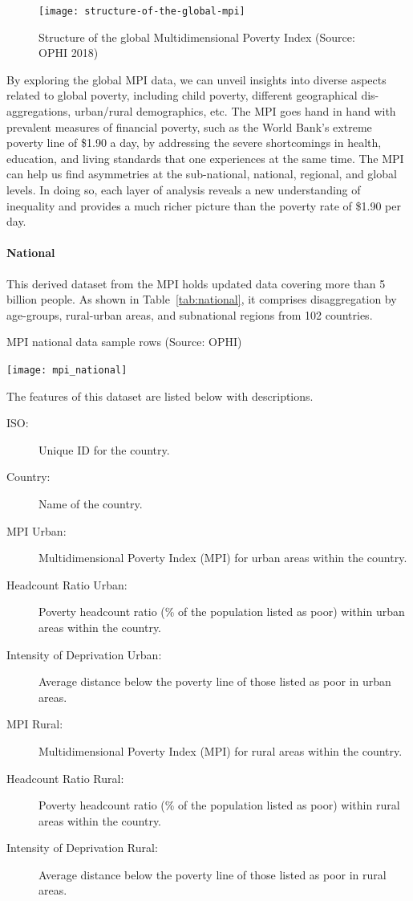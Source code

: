 \documentclass{swfuthesise}
\begin{document}
\begin{figure}[!htp]
    \centering
    \texttt{[image: structure-of-the-global-mpi]}
    \caption{Structure of the global Multidimensional Poverty Index (Source: OPHI 2018)}
    \label{fig:mpi}
\end{figure}

By exploring the global MPI data, we can unveil insights into diverse aspects related to global poverty, including child poverty, different geographical dis-aggregations, urban/rural demographics, etc. The MPI goes hand in hand with prevalent measures of financial poverty, such as the World Bank's extreme poverty line of \$1.90 a day\cite{world2020poverty}, by addressing the severe shortcomings in health, education, and living standards that one experiences at the same time. The MPI can help us find asymmetries at the sub-national, national, regional, and global levels. In doing so, each layer of analysis reveals a new understanding of inequality and provides a much richer picture than the poverty rate of \$1.90 per day.

\paragraph{National}

This derived dataset from the MPI holds updated data covering more than 5 billion
people. As shown in Table~\ref{tab:national}, it comprises disaggregation by age-groups, rural-urban areas, and subnational regions from 102 countries.

\begin{table}[ht]
  \centering
  \caption{MPI national data sample rows (Source: OPHI)\label{tab:national}}
  \texttt{[image: mpi\_national]}
\end{table}
  
The features of this dataset are listed below with descriptions.%
\begin{description}
\item[ISO:] Unique ID for the country.
\item[Country:] Name of the country.
\item[MPI Urban:] Multidimensional Poverty Index (MPI) for urban areas within the country.
\item[Headcount Ratio Urban:] Poverty headcount ratio (\% of the population listed as poor)
  within urban areas within the country.
\item[Intensity of Deprivation Urban:] Average distance below the poverty line of those
  listed as poor in urban areas.
\item[MPI Rural:] Multidimensional Poverty Index (MPI) for rural areas within the country.
\item[Headcount Ratio Rural:] Poverty headcount ratio (\% of the population listed as poor) within rural areas within the country.
\item[Intensity of Deprivation Rural:] Average distance below the poverty line of those listed as poor in rural areas.
\end{description}
\end{document}
